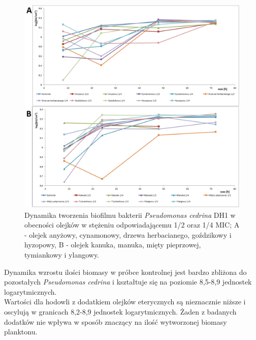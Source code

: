 \documentclass[11pt,a4paper]{report}
\begin{document}
\begin{figure}[!h]
\begin{center}
\includegraphics[scale=0.55]{img/dh1-c.png}
\caption{Dynamika tworzenia biofilmu bakterii \textit{Pseudomonas cedrina} DH1 w obecności olejków w stężeniu odpowiadającemu 1/2 oraz 1/4 MIC; A - olejek anyżowy, cynamonowy, drzewa herbacianego, goździkowy i hyzopowy, B - olejek kanuka, manuka, mięty pieprzowej, tymiankowy i ylangowy.}\label{dh1-c}
\end{center} 
\end{figure}

\clearpage


Dynamika wzrostu ilości biomasy w próbce kontrolnej jest bardzo zbliżona do pozostałych \textit{Pseudomonas cedrina} i kształtuje się na poziomie 8,5-8,9 jednostek logarytmicznych.\\
Wartości dla hodowli z dodatkiem olejków eterycznych są nieznacznie niższe i oscylują w granicach 8,2-8,9 jednostek logarytmicznych. Żaden z badanych dodatków nie wpływa w sposób znaczący na ilość wytworzonej biomasy planktonu.
\end{document}
